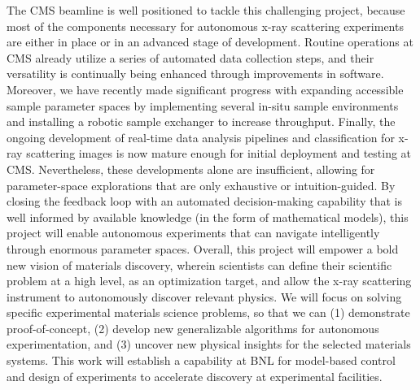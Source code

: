 \documentclass[11pt]{article}
\begin{document}
The CMS beamline is well positioned to tackle this challenging
project, because most of the components necessary for autonomous x-ray
scattering experiments are either in place or in an advanced stage of
development. Routine operations at CMS already utilize a series of
automated data collection steps, and their versatility is continually
being enhanced through improvements in software. Moreover, we have
recently made significant progress with expanding accessible sample
parameter spaces by implementing several in-situ sample environments
and installing a robotic sample exchanger to increase
throughput. Finally, the ongoing development of real-time data
analysis pipelines and classification for x-ray scattering images is
now mature enough for initial deployment and testing at
CMS. Nevertheless, these developments alone are insufficient, allowing
for parameter-space explorations that are only exhaustive or
intuition-guided. By closing the feedback loop with an automated
decision-making capability that is well informed by available
knowledge (in the form of mathematical models), this project will
enable autonomous experiments that can navigate intelligently through
enormous parameter spaces.  Overall, this project will empower a bold
new vision of materials discovery, wherein scientists can define their
scientific problem at a high level, as an optimization target, and
allow the x-ray scattering instrument to autonomously discover
relevant physics. We will focus on solving specific experimental
materials science problems, so that we can (1) demonstrate
proof-of-concept, (2) develop new
generalizable algorithms for autonomous experimentation, and (3)
uncover new physical insights for the selected materials systems. This
work will establish a capability at BNL for model-based control and
design of experiments to accelerate discovery at experimental
facilities. 
\end{document}
